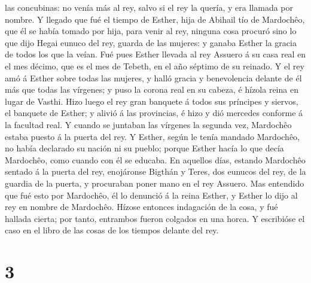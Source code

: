 las concubinas: no venía más al rey, salvo si el rey la quería, y era
llamada por nombre.  Y llegado que fué el tiempo de
Esther, hija de Abihail tío de Mardochêo, que él se había tomado por
hija, para venir al rey, ninguna cosa procuró sino lo que dijo Hegai
eunuco del rey, guarda de las mujeres: y ganaba Esther la gracia de
todos los que la veían.  Fué pues Esther llevada al rey
Assuero á su casa real en el mes décimo, que es el mes de Tebeth, en el
año séptimo de su reinado.  Y el rey amó á Esther sobre
todas las mujeres, y halló gracia y benevolencia delante de él más que
todas las vírgenes; y puso la corona real en su cabeza, é hízola reina
en lugar de Vasthi.  Hizo luego el rey gran banquete á
todos sus príncipes y siervos, el banquete de Esther; y alivió á las
provincias, é hizo y dió mercedes conforme á la facultad real.
 Y cuando se juntaban las vírgenes la segunda vez,
Mardochêo estaba puesto á la puerta del rey.  Y Esther,
según le tenía mandado Mardochêo, no había declarado su nación ni su
pueblo; porque Esther hacía lo que decía Mardochêo, como cuando con él
se educaba.  En aquellos días, estando Mardochêo sentado
á la puerta del rey, enojáronse Bigthán y Teres, dos eunucos del rey, de
la guardia de la puerta, y procuraban poner mano en el rey Assuero.
 Mas entendido que fué esto por Mardochêo, él lo denunció
á la reina Esther, y Esther lo dijo al rey en nombre de Mardochêo.
 Hízose entonces indagación de la cosa, y fué hallada
cierta; por tanto, entrambos fueron colgados en una horca. Y escribióse
el caso en el libro de las cosas de los tiempos delante del rey.

\hypertarget{section-2}{%
\section{3}\label{section-2}}


